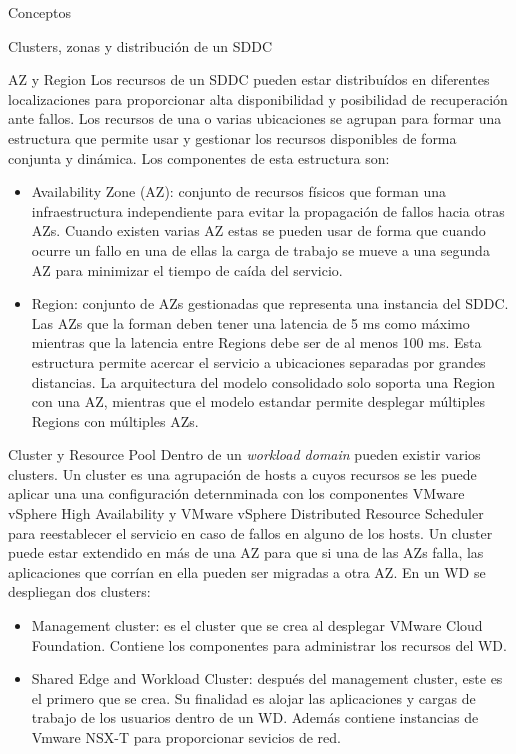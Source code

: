 \begin{section}{Conceptos}
\begin{subsection}{Clusters, zonas y distribución de un SDDC}
\begin{subsubsection}{AZ y Region}
Los recursos de un SDDC pueden estar distribuídos en diferentes localizaciones para proporcionar alta disponibilidad y posibilidad de recuperación ante fallos. Los recursos de una o varias ubicaciones se agrupan para formar una estructura que permite usar y gestionar los recursos disponibles de forma conjunta y dinámica. Los componentes de esta estructura son:
\begin{itemize}
  \item Availability Zone (AZ): conjunto de recursos físicos que forman una infraestructura independiente para evitar la propagación de fallos hacia otras AZs. Cuando existen varias AZ estas se pueden usar de forma que cuando ocurre un fallo en una de ellas la carga de trabajo se mueve a una segunda AZ para minimizar el tiempo de caída del servicio.
  
  \item Region: conjunto de AZs gestionadas que representa una instancia del SDDC. Las AZs que la forman deben tener una latencia de 5 ms como máximo mientras que la latencia entre Regions debe ser de al menos 100 ms. Esta estructura permite acercar el servicio a ubicaciones separadas por grandes distancias. La arquitectura del modelo consolidado solo soporta una Region con una AZ, mientras que el modelo estandar permite desplegar múltiples Regions con múltiples AZs.
\end{itemize} 
\end{subsubsection}
\begin{subsubsection}{Cluster y Resource Pool}
Dentro de un \textit{workload domain} pueden existir varios clusters. Un cluster es una agrupación de hosts a cuyos recursos se les puede aplicar una una configuración deternminada con los componentes VMware vSphere High Availability y VMware vSphere Distributed Resource Scheduler para reestablecer el servicio en caso de fallos en alguno de los hosts. Un cluster puede estar extendido en más de una AZ para que si una de las AZs falla, las aplicaciones que corrían en ella pueden ser migradas a otra AZ. En un WD se despliegan dos clusters:
\begin{itemize}
  \item Management cluster: es el cluster que se crea al desplegar VMware Cloud Foundation. Contiene los componentes para administrar los recursos del WD.
  \item Shared Edge and Workload Cluster: después del management cluster, este es el primero que se crea. Su finalidad es alojar las aplicaciones y cargas de trabajo de los usuarios dentro de un WD. Además contiene instancias de Vmware NSX-T para proporcionar sevicios de red.
\end{itemize}


\end{subsubsection}
\end{subsection}
\end{section}
